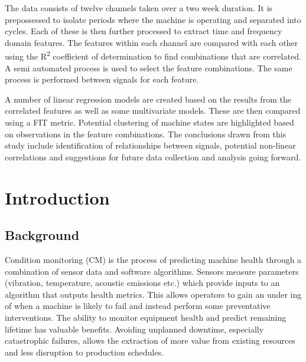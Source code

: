 \documentclass[]{article}
\begin{document}
The data consists of twelve channels taken over a two week duration. It is prepossessed to isolate periods where the machine is operating and separated into cycles. Each of these is then further processed to extract time and frequency domain features. The features within each channel are compared with each other using the R\textsuperscript{2} coefficient of determination to find combinations that are correlated. A semi automated process is used to select the feature combinations. The same process is performed between signals for each feature. 

A number of linear regression models are created based on the results from the correlated features as well as some multivariate models. These are then compared using a FIT metric. Potential clustering of machine states are highlighted based on observations in the feature combinations. The conclusions drawn from this study include identification of relationships between signals, potential non-linear correlations and suggestions for future data collection and analysis going forward.
\clearpage

\setcounter{tocdepth}{3}
\tableofcontents
\newpage

\listoffigures
\listoftables
\newpage

\printnoidxglossary[type=\acronymtype, style=list, nogroupskip=true]
\newpage


\section{Introduction}
\subsection{Background}
Condition monitoring (\gls{CM}) is the process of predicting machine health through a combination of sensor data and software algorithms. Sensors measure parameters (vibration, temperature, acoustic emissions etc.) which provide inputs to an algorithm that outputs health metrics. This allows operators to gain an under
ing of when a machine is likely to fail and instead perform some preventative interventions. The ability to monitor equipment health and predict remaining lifetime has valuable benefits. Avoiding unplanned downtime, especially catastrophic failures, allows the extraction of more value from existing resources and less disruption to production schedules.
\end{document}
